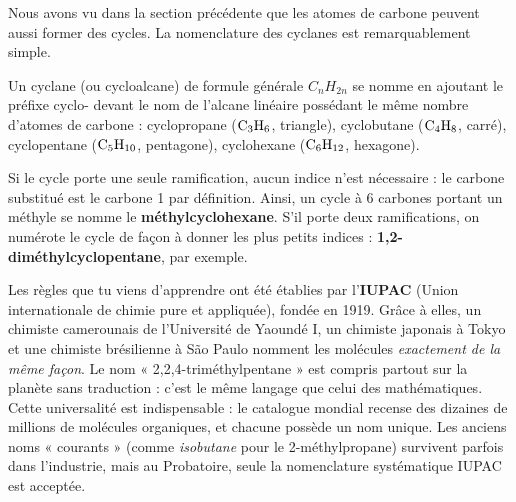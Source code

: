 \documentclass[11pt]{article}
\newcommand{\cle}[1]{{\popxbold\color{popdark}#1}}
\newcounter{popsec}
\newcounter{popsub}
\newcommand{\courssub}[1]{%
  \stepcounter{popsub}%
  \par\vspace{9pt}\noindent{\popxbold\fontsize{11.5}{13}\selectfont\color{popink}{\color{poporange}\thepopsec.\thepopsub}\hspace{6pt}#1}\par\nopagebreak\vspace{4pt}
}
\begin{document}
\courssub{Nomenclature des cyclanes}

Nous avons vu dans la section précédente que les atomes de carbone peuvent aussi former des \cle{cycles}. La nomenclature des cyclanes est remarquablement simple.

\begin{definition}
Un \cle{cyclane} (ou cycloalcane) de formule générale $C_nH_{2n}$ se nomme en ajoutant le préfixe \cle{cyclo-} devant le nom de l'alcane linéaire possédant le même nombre d'atomes de carbone : cyclopropane ($\ce{C3H6}$, triangle), cyclobutane ($\ce{C4H8}$, carré), cyclopentane ($\ce{C5H10}$, pentagone), cyclohexane ($\ce{C6H12}$, hexagone).
\end{definition}

\begin{exemplebox}
Si le cycle porte une seule ramification, aucun indice n'est nécessaire : le carbone substitué est le carbone 1 par définition. Ainsi, un cycle à 6 carbones portant un méthyle se nomme le \textbf{méthylcyclohexane}. S'il porte deux ramifications, on numérote le cycle de façon à donner les plus petits indices : \textbf{1,2-diméthylcyclopentane}, par exemple.
\end{exemplebox}

\begin{savaistu}
Les règles que tu viens d'apprendre ont été établies par l'\textbf{IUPAC} (Union internationale de chimie pure et appliquée), fondée en 1919. Grâce à elles, un chimiste camerounais de l'Université de Yaoundé I, un chimiste japonais à Tokyo et une chimiste brésilienne à São Paulo nomment les molécules \emph{exactement de la même façon}. Le nom « 2,2,4-triméthylpentane » est compris partout sur la planète sans traduction : c'est le même langage que celui des mathématiques. Cette universalité est indispensable : le catalogue mondial recense des dizaines de millions de molécules organiques, et chacune possède un nom unique. Les anciens noms « courants » (comme \emph{isobutane} pour le 2-méthylpropane) survivent parfois dans l'industrie, mais au Probatoire, seule la nomenclature systématique IUPAC est acceptée.
\end{savaistu}
\end{document}
